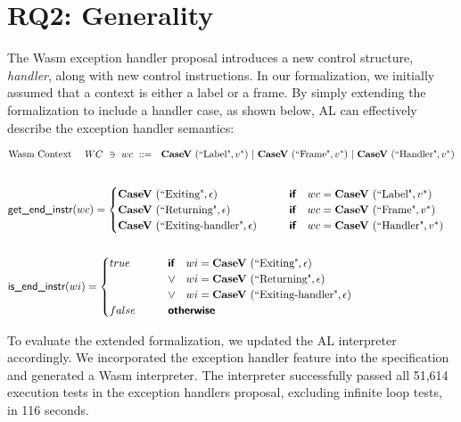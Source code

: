 \section{RQ2: Generality}
The Wasm exception handler proposal introduces a new control structure,
\textit{handler}, along with new control instructions.
In our formalization, we initially assumed that a context is either a label or
a frame.
By simply extending the formalization to include a handler case, as shown
below, AL can effectively describe the exception handler semantics:

\begin{align*}
%
  \text{Wasm Context}\quad ~ WC ~\ni~ wc ~::=~
    ~ \casev ~ (\text{``Label"}, \seq v)
    ~ | ~ \casev ~ (\text{``Frame"}, \seq v)
    ~ | ~ \casev ~ (\text{``Handler"}, \seq v) \\
\end{align*}
\begin{align*}
%
\newline \\
  &\getendinstr(wc) =
  \begin{cases}
    \casev ~ (\text{``Exiting"}, \epsilon) &\quad\quad\premise{if}\quad wc = \casev ~ (\text{``Label"}, \seq v) \\
    \casev ~ (\text{``Returning"}, \epsilon) &\quad\quad\premise{if}\quad wc = \casev ~ (\text{``Frame"}, \seq v) \\
    \casev ~ (\text{``Exiting-handler"}, \epsilon) &\quad\quad\premise{if}\quad wc = \casev ~ (\text{``Handler"}, \seq v) \\
  \end{cases} \\
%
\newline \\
  &\isendinstr(wi) =
  \begin{cases}
    true &\quad\quad\premise{if}\quad wi = \casev ~ (\text{``Exiting"}, \epsilon) \\
    &\quad\quad\lor\quad
    wi = \casev ~ (\text{``Returning"}, \epsilon) \\
    &\quad\quad\lor\quad
    wi = \casev ~ (\text{``Exiting-handler"}, \epsilon) \\
    false &\quad\quad\premise{otherwise}
  \end{cases} \\
\end{align*}

To evaluate the extended formalization, we updated the AL interpreter
accordingly.
We incorporated the exception handler feature into the specification and
generated a Wasm interpreter.
The interpreter successfully passed all 51,614 execution tests in the exception handlers
proposal, excluding infinite loop tests, in 116 seconds.

